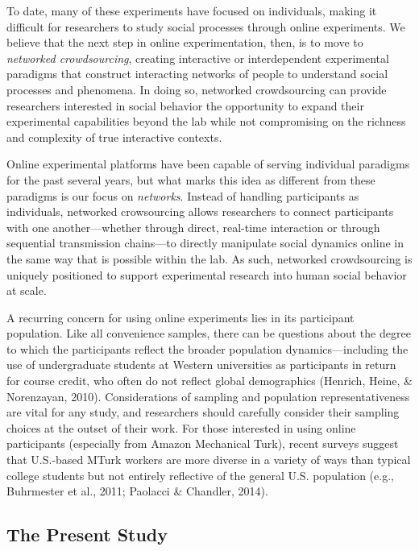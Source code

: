 \documentclass[10pt, letterpaper]{article}
\begin{document}
To date, many of these experiments have focused on individuals, making
it difficult for researchers to study social processes through online
experiments. We believe that the next step in online experimentation,
then, is to move to \emph{networked crowdsourcing}, creating interactive
or interdependent experimental paradigms that construct interacting
networks of people to understand social processes and phenomena. In
doing so, networked crowdsourcing can provide researchers interested in
social behavior the opportunity to expand their experimental
capabilities beyond the lab while not compromising on the richness and
complexity of true interactive contexts.

Online experimental platforms have been capable of serving individual
paradigms for the past several years, but what marks this idea as
different from these paradigms is our focus on \emph{networks}. Instead
of handling participants as individuals, networked crowsourcing allows
researchers to connect participants with one another---whether through
direct, real-time interaction or through sequential transmission
chains---to directly manipulate social dynamics online in the same way
that is possible within the lab. As such, networked crowdsourcing is
uniquely positioned to support experimental research into human social
behavior at scale.

A recurring concern for using online experiments lies in its participant
population. Like all convenience samples, there can be questions about
the degree to which the participants reflect the broader population
dynamics---including the use of undergraduate students at Western
universities as participants in return for course credit, who often do
not reflect global demographics (Henrich, Heine, \& Norenzayan, 2010).
Considerations of sampling and population representativeness are vital
for any study, and researchers should carefully consider their sampling
choices at the outset of their work. For those interested in using
online participants (especially from Amazon Mechanical Turk), recent
surveys suggest that U.S.-based MTurk workers are more diverse in a
variety of ways than typical college students but not entirely
reflective of the general U.S. population (e.g., Buhrmester et al.,
2011; Paolacci \& Chandler, 2014).

\subsection{The Present Study}\label{the-present-study}
\end{document}

